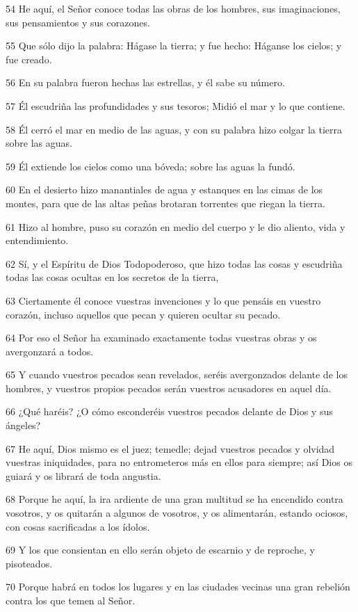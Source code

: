 \par 54 He aquí, el Señor conoce todas las obras de los hombres, sus imaginaciones, sus pensamientos y sus corazones.
\par 55 Que sólo dijo la palabra: Hágase la tierra; y fue hecho: Háganse los cielos; y fue creado.
\par 56 En su palabra fueron hechas las estrellas, y él sabe su número.
\par 57 Él escudriña las profundidades y sus tesoros; Midió el mar y lo que contiene.
\par 58 Él cerró el mar en medio de las aguas, y con su palabra hizo colgar la tierra sobre las aguas.
\par 59 Él extiende los cielos como una bóveda; sobre las aguas la fundó.
\par 60 En el desierto hizo manantiales de agua y estanques en las cimas de los montes, para que de las altas peñas brotaran torrentes que riegan la tierra.
\par 61 Hizo al hombre, puso su corazón en medio del cuerpo y le dio aliento, vida y entendimiento.
\par 62 Sí, y el Espíritu de Dios Todopoderoso, que hizo todas las cosas y escudriña todas las cosas ocultas en los secretos de la tierra,
\par 63 Ciertamente él conoce vuestras invenciones y lo que pensáis en vuestro corazón, incluso aquellos que pecan y quieren ocultar su pecado.
\par 64 Por eso el Señor ha examinado exactamente todas vuestras obras y os avergonzará a todos.
\par 65 Y cuando vuestros pecados sean revelados, seréis avergonzados delante de los hombres, y vuestros propios pecados serán vuestros acusadores en aquel día.
\par 66 ¿Qué haréis? ¿O cómo esconderéis vuestros pecados delante de Dios y sus ángeles?
\par 67 He aquí, Dios mismo es el juez; temedle; dejad vuestros pecados y olvidad vuestras iniquidades, para no entrometeros más en ellos para siempre; así Dios os guiará y os librará de toda angustia.
\par 68 Porque he aquí, la ira ardiente de una gran multitud se ha encendido contra vosotros, y os quitarán a algunos de vosotros, y os alimentarán, estando ociosos, con cosas sacrificadas a los ídolos.
\par 69 Y los que consientan en ello serán objeto de escarnio y de reproche, y pisoteados.
\par 70 Porque habrá en todos los lugares y en las ciudades vecinas una gran rebelión contra los que temen al Señor.
